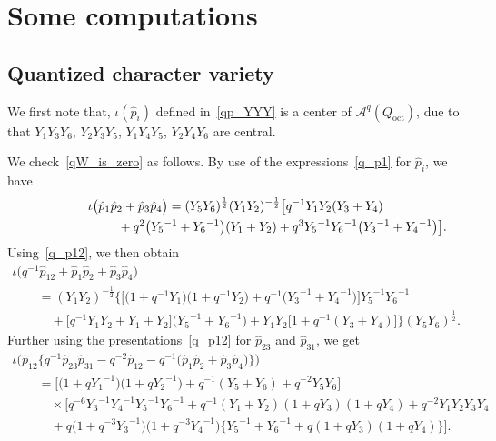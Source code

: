 \documentclass[pdftex]{sigma}
\numberwithin{equation}{section}
\begin{document}
\appendix
\section{Some computations}

\subsection{Quantized character variety}\label{sec:qW_proof}

We first note that, $\iota(\hat{p}_i)$ defined in~\eqref{qp_YYY} is a center of $\mathcal{A}^q(Q_{\text{oct}})$, due to that $Y_1 Y_3 Y_6$, $Y_2 Y_3 Y_5$, $Y_1 Y_4 Y_5$, $Y_2 Y_4 Y_6$ are central.

We check~\eqref{qW_is_zero} as follows. By use of the expressions~\eqref{q_p1} for $\hat{p}_i$, we have
\begin{gather*}
 \iota \big( \hat{p}_1 \hat{p}_2 + \hat{p}_3 \hat{p}_4 \big) =(Y_5 Y_6 )^{\frac{1}{2}} ( Y_1 Y_2 )^{-\frac{1}{2}} \bigl[ q^{-1} Y_1 Y_2 ( Y_3 + Y_4 ) \\
\hphantom{\iota \big( \hat{p}_1 \hat{p}_2 + \hat{p}_3 \hat{p}_4 \big) =}{} + q^2 \big( {Y_5}^{-1} + {Y_6}^{-1} \big) ( Y_1 + Y_2) + q^3 {Y_5}^{-1} {Y_6}^{-1} \big( {Y_3}^{-1} + {Y_4}^{-1} \big) \bigr] .
\end{gather*}
Using~\eqref{q_p12}, we then obtain
\begin{gather*}
 \iota \big( q^{-1} \hat{p}_{12} + \hat{p}_1 \hat{p}_2 + \hat{p}_3 \hat{p}_4 \big) \\
\qquad{} = ( Y_1 Y_2 )^{-\frac{1}{2}} \big\{ \big[\big( 1 + q^{-1} Y_1\big)\big( 1 + q^{-1} Y_2\big) + q^{-1}\big( {Y_3}^{-1} + {Y_4}^{-1}\big)\big] {Y_5}^{-1} {Y_6}^{-1} \\
 \qquad\quad{} + \big[ q^{-1} Y_1 Y_2 + Y_1 + Y_2\big] \big( {Y_5}^{-1} + {Y_6}^{-1}\big) + Y_1 Y_2 \big[ 1 + q^{-1} ( Y_3 + Y_4 )\big] \big\}( Y_5 Y_6)^{\frac{1}{2}} .
\end{gather*}
Further using the presentations~\eqref{q_p12} for $\hat{p}_{23}$ and $\hat{p}_{31}$, we get
\begin{gather}
\iota \big( \hat{p}_{12}\big\{ q^{-1} \hat{p}_{23} \hat{p}_{31} -q^{-2} \hat{p}_{12} - q^{-1}\big( \hat{p}_1 \hat{p}_2 + \hat{p}_3 \hat{p}_4\big)\big\}\big)\nonumber \\
 \qquad{} = \big[\big( 1 + q {Y_1}^{-1}\big)\big( 1 + q {Y_2}^{-1}\big) + q^{-1} ( Y_5 + Y_6 ) +q^{-2} Y_5 Y_6\big]\nonumber \\
 \qquad\quad{} \times \big[ q^{-6} {Y_3}^{-1} {Y_4}^{-1} {Y_5}^{-1} {Y_6}^{-1} + q^{-1} ( Y_1 +Y_2)( 1 + q Y_3)( 1 + q Y_4) + q^{-2} Y_1 Y_2 Y_3 Y_4\nonumber \\
 \qquad\quad{} + q \big( 1+ q^{-3}{Y_3}^{-1}\big)\big( 1 + q^{-3} {Y_4}^{-1}\big) \big\{ {Y_5}^{-1} + {Y_6}^{-1} + q ( 1 + q Y_3)( 1 + q Y_4)\big\}\big] . \label{qa_1}
 \end{gather}
\end{document}
